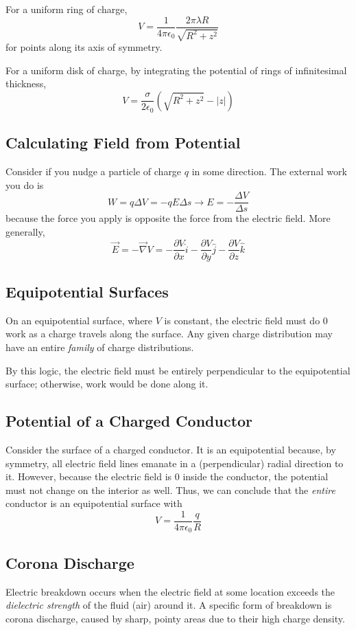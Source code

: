 \documentclass[../PhysicsFormulae.tex]{subfiles}
\begin{document}
For a uniform ring of charge, 
\[ V = \frac{1}{4\pi\epsilon_0} \frac{2\pi \lambda R}{\sqrt{R^2 + z^2} } \]
for points along its axis of symmetry. \bigskip 

For a uniform disk of charge, by integrating the potential of rings of infinitesimal thickness, 
\[ V = \frac{\sigma}{2\epsilon_0} \left(\sqrt{R^2 + z^2} - |z| \right) \]

\subsection{Calculating Field from Potential}
Consider if you nudge a particle of charge $q$ in some direction. The external work you do is
\[ W = q\Delta V = -qE \Delta s \rightarrow E = -\frac{\Delta V}{\Delta s} \]
because the force you apply is opposite the force from the electric field. More generally, 
\[ \vec{E} = -\vec{\nabla} V = -\frac{\partial V}{\partial x} \hat{i} - \frac{\partial V}{\partial y} \hat{j} - \frac{\partial V}{\partial z} \hat{k} \]

\subsection{Equipotential Surfaces}
On an equipotential surface, where $V$ is constant, the electric field must do 0 work as a charge travels along the surface. Any given charge distribution may have an entire \textit{family} of charge distributions. \bigskip

By this logic, the electric field must be entirely perpendicular to the equipotential surface; otherwise, work would be done along it. 

\subsection{Potential of a Charged Conductor}
Consider the surface of a charged conductor. It is an equipotential because, by symmetry, all electric field lines emanate in a (perpendicular) radial direction to it. However, because the electric field is 0 inside the conductor, the potential must not change on the interior as well. Thus, we can conclude that the \textit{entire} conductor is an equipotential surface with 
\[ V = \frac{1}{4\pi \epsilon_0} \frac{q}{R} \]

\subsection{Corona Discharge}
Electric breakdown occurs when the electric field at some location exceeds the \textit{dielectric strength} of the fluid (air) around it. A specific form of breakdown is corona discharge, caused by sharp, pointy areas due to their high charge density. \bigskip
\end{document}
